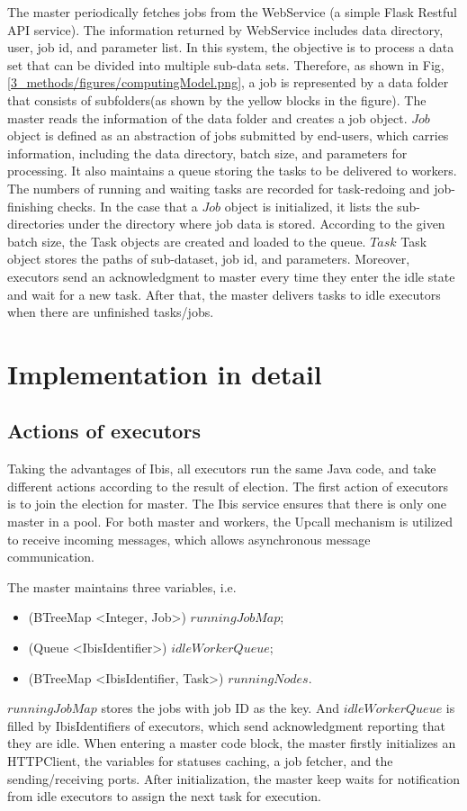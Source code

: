 The master periodically fetches jobs from the WebService (a simple Flask Restful API service). 
The information returned by WebService includes data directory, user, job id, and parameter list. 
In this system, the objective is to process a data set that can be divided into multiple sub-data sets. 
Therefore, as shown in Fig, \ref{3_methods/figures/computingModel.png}, a job is represented by a data folder that consists of subfolders(as shown by the yellow blocks in the figure).
The master reads the information of the data folder and creates a job object. 
$Job$ object is defined as an abstraction of jobs submitted by end-users, which carries information, including the data directory, batch size, and parameters for processing. 
It also maintains a queue storing the tasks to be delivered to workers. The numbers of running and waiting tasks are recorded for task-redoing and job-finishing checks. 
In the case that a $Job$ object is initialized, it lists the sub-directories under the directory where job data is stored.
According to the given batch size, the Task objects are created and loaded to the queue. 
$Task$ Task object stores the paths of sub-dataset, job id, and parameters. 
Moreover, executors send an acknowledgment to master every time they enter the idle state and wait for a new task. 
After that, the master delivers tasks to idle executors when there are unfinished tasks/jobs.


\section{Implementation in detail}
\subsection{Actions of executors}\label{actionOfExcution}
Taking the advantages of Ibis, all executors run the same Java code, and take different actions according to the result of election. 
The first action of executors is to join the election for master. 
The Ibis service ensures that there is only one master in a pool. 
For both master and workers, the Upcall mechanism is utilized to receive incoming messages, which allows asynchronous message communication.

The master maintains three variables, i.e.
\begin{itemize}
  \item (BTreeMap <Integer, Job>) $runningJobMap$; 
  \item (Queue <IbisIdentifier>) $idleWorkerQueue$; 
  \item (BTreeMap <IbisIdentifier, Task>) $runningNodes$.
\end{itemize}
$runningJobMap$ stores the jobs with job ID as the key. And $idleWorkerQueue$ is filled by IbisIdentifiers of executors, which send acknowledgment reporting that they are idle.
When entering a master code block, the master firstly initializes an HTTPClient, the variables for statuses caching, a job fetcher, and the sending/receiving ports. 
After initialization, the master keep waits for notification from idle executors to assign the next task for execution.

